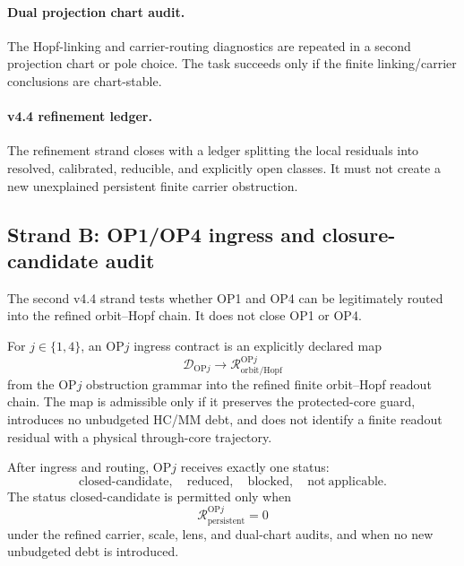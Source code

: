 \paragraph{Dual projection chart audit.}
The Hopf-linking and carrier-routing diagnostics are repeated in a second
projection chart or pole choice.  The task succeeds only if the finite
linking/carrier conclusions are chart-stable.

\paragraph{v4.4 refinement ledger.}
The refinement strand closes with a ledger splitting the local residuals into
resolved, calibrated, reducible, and explicitly open classes.  It must not
create a new unexplained persistent finite carrier obstruction.

\subsection{Strand B: OP1/OP4 ingress and closure-candidate audit}
\label{subsec:v44-strand-b-op-audit}

The second v4.4 strand tests whether OP1 and OP4 can be legitimately routed
into the refined orbit--Hopf chain.  It does not close OP1 or OP4.

\begin{definition}
\label{def:v44-op-ingress-contract}
For \(j\in\{1,4\}\), an OP\(j\) ingress contract is an explicitly declared
map
\[
    \mathcal D_{\mathrm{OP}j}
    \longrightarrow
    \mathcal R_{\mathrm{orbit/Hopf}}^{\mathrm{OP}j}
\]
from the OP\(j\) obstruction grammar into the refined finite orbit--Hopf
readout chain.  The map is admissible only if it preserves the protected-core
guard, introduces no unbudgeted HC/MM debt, and does not identify a finite
readout residual with a physical through-core trajectory.
\end{definition}

\begin{definition}
\label{def:v44-op-closure-candidate-status}
After ingress and routing, OP\(j\) receives exactly one status:
\[
    \mathrm{closed\text{-}candidate},
    \quad
    \mathrm{reduced},
    \quad
    \mathrm{blocked},
    \quad
    \mathrm{not\ applicable}.
\]
The status \(\mathrm{closed\text{-}candidate}\) is permitted only when
\[
    \mathcal R_{\mathrm{persistent}}^{\mathrm{OP}j}=0
\]
under the refined carrier, scale, lens, and dual-chart audits, and when no new
unbudgeted debt is introduced.
\end{definition}

